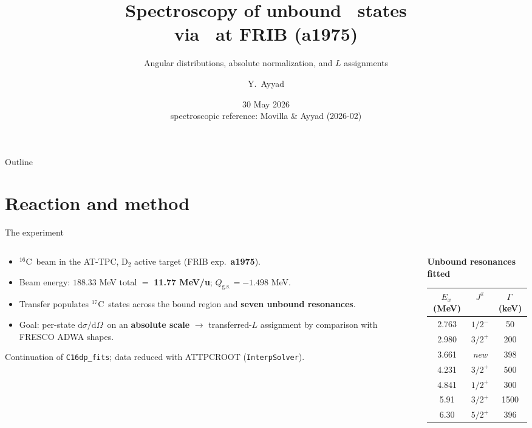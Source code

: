 \documentclass[aspectratio=169,11pt]{beamer}
\title[\Cs\dpr\Cse\ analysis]{Spectroscopy of unbound \Cse\ states\\ via \Cs\dpr\Cse\ at FRIB (a1975)}
\subtitle{Angular distributions, absolute normalization, and $L$ assignments}
\author[Y.~Ayyad]{Y.~Ayyad}
\institute[USC]{IGFAE -- Universidade de Santiago de Compostela}
\date{30 May 2026 \\ \footnotesize spectroscopic reference: Movilla \& Ayyad (2026-02)}
\newcommand{\Cs}{$^{16}$C}
\newcommand{\Cse}{$^{17}$C}
\newcommand{\dsdo}{$\mathrm{d}\sigma/\mathrm{d}\Omega$}
\newcommand{\Ex}{$E_x$}
\begin{document}
{
\begin{frame}\titlepage\end{frame}}

\begin{frame}{Outline}
  \tableofcontents
\end{frame}

\section{Reaction and method}

\begin{frame}{The experiment}
  \begin{columns}[T]
    \begin{column}{0.56\textwidth}
      \begin{itemize}
        \item \Cs\ beam in the AT-TPC, D$_2$ active target (FRIB exp.\ \textbf{a1975}).
        \item Beam energy: $188.33$ MeV total $=$ \textbf{11.77 MeV/u};
              $Q_{\mathrm{g.s.}}=-1.498$ MeV.
        \item Transfer populates \Cse\ states across the bound region and
              \textbf{seven unbound resonances}.
        \item Goal: per-state \dsdo\ on an \textbf{absolute scale} $\rightarrow$
              transferred-$L$ assignment by comparison with FRESCO ADWA shapes.
      \end{itemize}
      \vspace{0.4em}
      {\small Continuation of \texttt{C16dp\_fits}; data reduced with ATTPCROOT
      (\texttt{InterpSolver}).}
    \end{column}
    \begin{column}{0.44\textwidth}
      \small
      \centering
      \textbf{Unbound resonances fitted}\\[0.3em]
      \begin{tabular}{@{}ccc@{}}
        \toprule
        \Ex\,(MeV) & $J^\pi$ & $\Gamma$\,(keV)\\
        \midrule
        2.763 & $1/2^-$ & 50 \\
        2.980 & $3/2^+$ & 200 \\
        3.661 & \textit{new} & 398 \\
        4.231 & $3/2^+$ & 500 \\
        4.841 & $1/2^+$ & 300 \\
        5.91  & $3/2^+$ & 1500 \\
        6.30  & $5/2^+$ & 396 \\
        \bottomrule
      \end{tabular}
    \end{column}
  \end{columns}
\end{frame}
\end{document}
